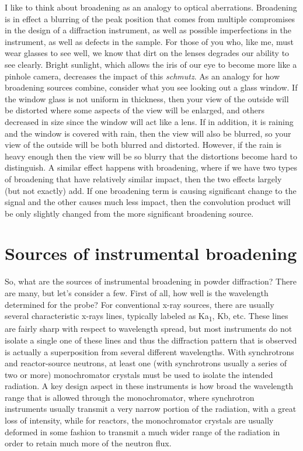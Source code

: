  I like to think about broadening as an analogy to optical aberrations. Broadening is in effect a blurring of the peak position that comes from multiple compromises in the design of a diffraction instrument, as well as possible imperfections in the instrument, as well as defects in the sample. For those of you who, like me, must wear glasses to see well, we know that dirt on the lenses degrades our ability to see clearly. Bright sunlight, which allows the iris of our eye to become more like a pinhole camera, decreases the impact of this \textit{schmutz}. As an analogy for how broadening sources combine, consider what you see looking out a glass window. If the window glass is not uniform in thickness, then your view of the outside will be distorted where some aspects of the view will be enlarged, and others decreased in size since the window will act like a lens. If in addition, it is raining and the window is covered with rain, then the view will also be blurred, so your view of the outside will be both blurred and distorted. However, if the rain is heavy enough then the view will be so blurry that the distortions become hard to distinguish. A similar effect happens with broadening, where if we have two types of broadening that have relatively similar impact, then the two effects largely (but not exactly) add. If one broadening term is causing significant change to the signal and the other causes much less impact, then the convolution product will be only slightly changed from the more significant broadening source. 

 

\section{Sources of instrumental broadening}

So, what are the sources of instrumental broadening in powder diffraction? There are many, but let’s consider a few. First of all, how well is the wavelength determined for the probe? For conventional x-ray sources, there are usually several characteristic x-rays lines, typically labeled as Ka\textsubscript{1}, Kb, etc. These lines are fairly sharp with respect to wavelength spread, but most instruments do not isolate a single one of these lines and thus the diffraction pattern that is observed is actually a superposition from several different wavelengths. With synchrotrons and reactor-source neutrons, at least one (with synchrotrons usually a series of two or more) monochromator crystals must be used to isolate the intended radiation. A key design aspect in these instruments is how broad the wavelength range that is allowed through the monochromator, where synchrotron instruments usually transmit a very narrow portion of the radiation, with a great loss of intensity, while for reactors, the monochromator crystals are usually deformed in some fashion to transmit a much wider range of the radiation in order to retain much more of the neutron flux.

